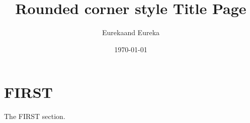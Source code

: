 \documentclass[
  layout={slide, aspect=16|9},
]{../code/ztex}
\title{Rounded corner style Title Page}
\author{Eureka\quad and \quad \ztex{} Eureka}
\date{\today}
\begin{document}
\maketitle

\section{FIRST}
The FIRST section.
\end{document}
